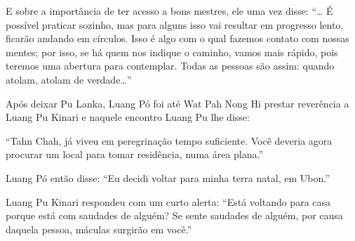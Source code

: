 E sobre a importância de ter acesso a bons mestres, ele uma vez disse:
``\ldots{} É possível praticar sozinho, mas para alguns isso vai
resultar em progresso lento, ficarão andando em círculos. Isso é algo
com o qual fazemos contato com nossas mentes; por isso, se há quem nos
indique o caminho, vamos mais rápido, pois teremos uma abertura para
contemplar. Todas as pessoas são assim: quando atolam, atolam de
verdade\ldots{}''

Após deixar Pu Lanka, Luang Pó foi até Wat Pah Nong Hi prestar
reverência a Luang Pu Kinari e naquele encontro Luang Pu lhe disse:

``Tahn Chah, já viveu em peregrinação tempo suficiente. Você deveria
agora procurar um local para tomar residência, numa área plana.''

Luang Pó então disse: ``Eu decidi voltar para minha terra natal, em
Ubon.''

Luang Pu Kinari respondeu com um curto alerta: ``Está voltando para casa
porque está com saudades de alguém? Se sente saudades de alguém, por
causa daquela pessoa, máculas surgirão em você.''
